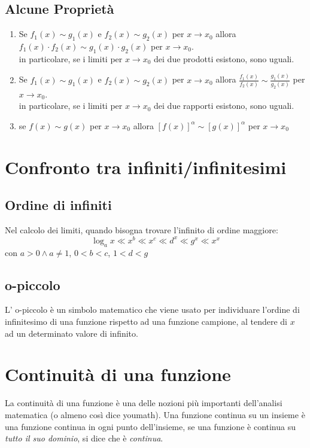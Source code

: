 \documentclass[12pt, a4paper, openany]{book}
\begin{document}
\subsection*{Alcune Proprietà}
\begin{enumerate}
	\item Se $f_1(x) \sim g_1(x)$ e $f_2(x) \sim g_2(x)$ per $x \to x_0$ allora $f_1(x) \cdot f_2(x) \sim g_1(x) \cdot g_2(x)$ per $x \to x_0$.
	      \\in particolare, se i limiti per $x \to x_0$ dei due prodotti esistono, sono uguali.
	\item Se $f_1(x) \sim g_1(x)$ e $f_2(x) \sim g_2(x)$ per $x \to x_0$ allora $\frac{f_1(x)}{f_2(x)} \sim \frac{g_1(x)}{g_2(x)}$ per $x \to x_0$.
	      \\in particolare, se i limiti per $x \to x_0$ dei due rapporti esistono, sono uguali.
	\item se $f(x) \sim g(x)$ per $x \to x_0$ allora $[f(x)]^\alpha \sim [g(x)]^\alpha$ per $x \to x_0$
\end{enumerate}
\section{Confronto tra infiniti/infinitesimi}
\subsection*{Ordine di infiniti}
Nel calcolo dei limiti, quando bisogna trovare l'infinito di ordine maggiore:
$$ \log_ax\ll x^b\ll x^c\ll d^x\ll g^x\ll x^x $$
con $a>0 \wedge a\neq 1$, $0<b<c$, $1<d<g$
\subsection*{o-piccolo}
L' o-piccolo è un simbolo matematico che viene usato per individuare l'ordine di infinitesimo di una funzione rispetto ad una funzione campione,
al tendere di $x$ ad un determinato valore di infinito.

\section{Continuità di una funzione}
La continuità di una funzione è una delle nozioni più importanti dell'analisi matematica (o almeno così dice youmath).
Una funzione continua su un insieme è una funzione continua in ogni punto dell'insieme, se una funzione è continua su \emph{tutto il suo dominio}, si dice che è \emph{continua}.
\end{document}
